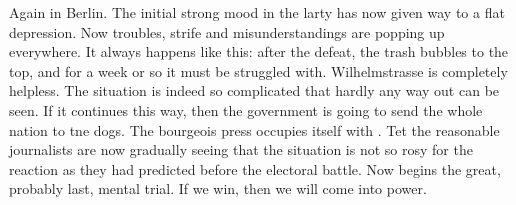 
Again in Berlin. The initial strong mood in the larty has now given way to a flat depression. Now troubles, strife and misunderstandings are popping up everywhere. It always happens like this: after the defeat, the trash bubbles to the top, and for a week or so it must be struggled with.  Wilhelmstrasse is completely helpless. The situation is indeed so complicated that hardly any way out can be seen. If it continues this way, then the government is going to send the whole nation to tne dogs. The bourgeois press occupies itself with . Tet the reasonable journalists are now gradually seeing that the situation is not so rosy for the reaction as they had predicted before the electoral battle. Now begins the great, probably last, mental trial. If we win, then we will come into power.

